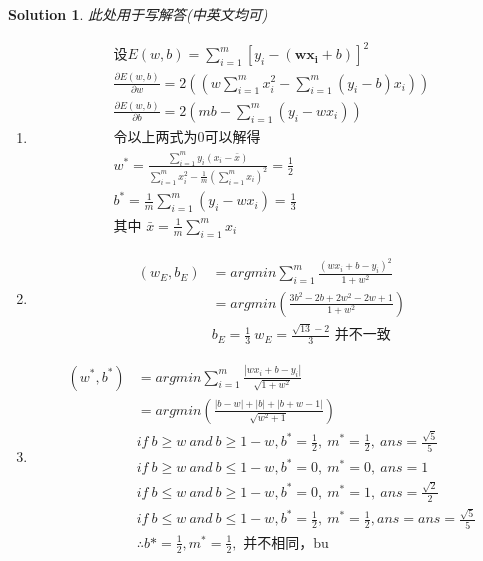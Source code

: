 \documentclass[a4paper,UTF8]{article}
\numberwithin{equation}{section}
\newtheorem*{solution}{Solution}
\begin{document}
\begin{solution}
此处用于写解答(中英文均可)
\begin{enumerate}[(1)]
\item
\begin{equation*}
\begin{split}
	\text{设} E(w,b)=\sum_{i=1}^m [y_i-(\mathbf{w}\mathbf{x_i}+b)]^2\\
	\frac{\partial E(w,b)}{\partial w} = 2\left((w \sum_{i=1}^m x_i^2- \sum_{i=1}^m(y_i-b)x_i)\right)\\
	\frac{\partial E(w,b)}{\partial b} = 2\left(mb-\sum_{i=1}^m(y_i-wx_i)\right)\\
	\text{令以上两式为0可以解得}\\
	w^* = \frac{\sum_{i=1}^m y_i(x_i-\bar{x})}{\sum_{i=1}^mx_i^2-\frac{1}{m}\left(\sum_{i=1}^m x_i\right)^2}=\frac{1}{2}\\
	b^* = \frac{1}{m} \sum_{i=1}^m(y_i-wx_i)=\frac{1}{3}\\
	\text{其中 } \bar{x}=\frac{1}{m} \sum_{i=1}^m x_i
\end{split}
\end{equation*}
\item
\begin{equation*}
\begin{split}
	(w_E,b_E) &= argmin \sum_{i=1}^m \frac{(wx_i+b-y_i)^2}{1+w^2}\\
	&=argmin\left( \frac{3b^2-2b+2w^2-2w+1}{1+w^2}	\right)\\
	& b_E = \frac{1}{3}\ w_E = \frac{\sqrt{13}-2}{3} \text{ 并不一致}
\end{split}
\end{equation*}
\item 
\begin{equation*}
	\begin{split}
		(w^*,b^*) &= argmin \sum_{i=1}^m \frac{| wx_i+b-y_i |}{\sqrt{1+w^2}}\\
		& = argmin \left(\frac{|b-w|+|b|+|b+w-1|}{\sqrt{w^2+1}}\right) \\
		& if\ b\ge w\ and\ b\ge 1-w, b^* = \frac{1}{2},\ m^*=\frac{1}{2},\ ans=\frac{\sqrt{5}}{5}\\
		& if\ b\ge w\ and\ b\le 1-w, b^*=0,\ m^*=0,\ ans=1\\
		& if\ b\le w\ and\ b\ge 1-w, b^*=0,\ m^*=1,\ ans=\frac{\sqrt{2}}{2}\\
		& if\ b\le w\ and\ b\le 1-w, b^*=\frac{1}{2},\ m^*=\frac{1}{2},ans=ans=\frac{\sqrt{5}}{5}\\
		&\therefore b*=\frac{1}{2},m^*=\frac{1}{2},\text{ 并不相同，bu}
	\end{split}
\end{equation*}
\end{enumerate}
\end{solution}
\end{document}

